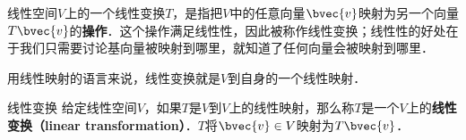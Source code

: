 

\begin{issues}
\issueDraft
{}
\end{issues}




线性空间$V$上的一个线性变换$T$，是指把$V$中的任意向量$\bvec{v}$映射为另一个向量$T\bvec{v}$的\textbf{操作}．这个操作满足线性性，因此被称作线性变换；线性性的好处在于我们只需要讨论基向量被映射到哪里，就知道了任何向量会被映射到哪里．

用线性映射的语言来说，线性变换就是$V$到自身的一个线性映射．

\begin{definition}{线性变换}
给定线性空间$V$，如果$T$是$V$到$V$上的线性映射，那么称$T$是一个$V$上的\textbf{线性变换（linear transformation）}．$T$将$\bvec{v}\in V$映射为$T\bvec{v}$．
\end{definition}
